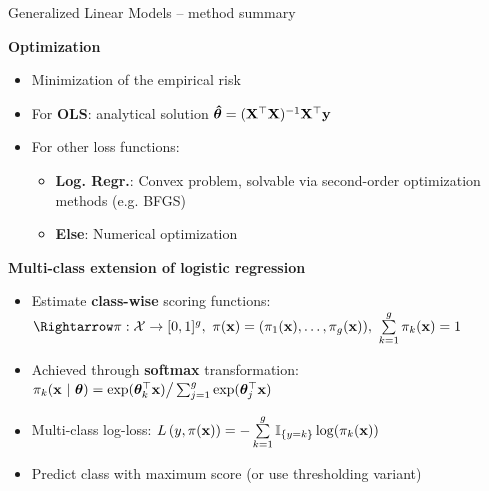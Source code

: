\documentclass[11pt,compress,t,notes=noshow, xcolor=table]{beamer}
\newcommand{\highlight}[1]{\textcolor{hlcol}{\textbf{#1}}}
\begin{document}
\begin{frame2}{Generalized Linear Models -- method summary}

\highlight{Optimization} 

\begin{itemize}
    \item Minimization of the empirical risk
    \item For \textbf{OLS}: analytical solution $\bm{\hat\theta} = (\mathbf{X}^\top \mathbf{X})^{-1} \mathbf{X}^\top \mathbf{y}$
    \item For other loss functions: 
    \begin{itemize}
        \item \textbf{Log. Regr.}: Convex problem, solvable via second-order optimization methods (e.g. BFGS)
        \item \textbf{Else}: Numerical optimization 
    \end{itemize}
    
\end{itemize}

\medskip



\highlight{Multi-class extension of logistic regression}

\begin{itemize}
  \item Estimate \textbf{class-wise} scoring functions:
  $\Rightarrow \pi: \Xspace \rightarrow \unitint^g, ~
  \pix = (\pikx[1], \dots, \pikx[g]), ~\sumkg \pikx = 1$
  \item Achieved through \textbf{softmax} transformation: 
  $\pi_{k}(\mathbf{x} ~|~ \bm{\theta}) = \exp(\bm{\theta}_k^\top \mathbf{x}) \big/ \sum_{j=1}^g \exp(\bm{\theta}_j^\top 
  \mathbf{x})  $
  \item Multi-class log-loss: $L\left(y, \pi(\mathbf{x})\right) = - \sum\limits_{k=1}^g \mathbb{I}_{\{y = k\}} \log(\pi_{k}(\mathbf{x}))$
  \item Predict class with maximum score (or use thresholding variant)
\end{itemize}

\end{frame2}
\end{document}
